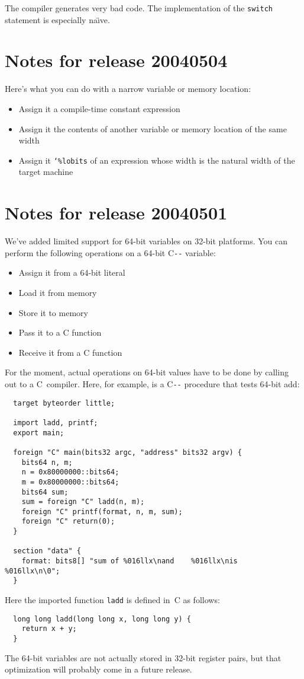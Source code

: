 \documentclass{article}
\def\PAL{\mbox{C{\texttt{-{}-}}}}
\begin{document}
The compiler generates very bad code.
The implementation of the \texttt{switch} statement is especially
na\"\i ve.


\section{Notes for release 20040504}

Here's what you can do with a narrow variable or memory location:
\begin{itemize}
\item
Assign it a compile-time constant expression
\item
Assign it the contents of another variable or memory location of the
same width
\item
Assign it \texttt{\char`\%lobits} of an expression whose width is the
natural width of the target machine
\end{itemize}


\section{Notes for release 20040501}

We've added limited support for 64-bit variables on 32-bit platforms.
You can perform the following operations on a 64-bit {\PAL} variable:
\begin{itemize}
\item Assign it from a 64-bit literal
\item   Load it from memory
\item    Store it to memory
\item   Pass it to a C function
\item   Receive it from a C function
\end{itemize}
For the moment, actual operations on 64-bit values have to be done by
calling out to a C~compiler.
Here, for example, is a {\PAL}
procedure that tests 64-bit add:
\begin{verbatim} 
  target byteorder little;
  
  import ladd, printf;
  export main;
  
  foreign "C" main(bits32 argc, "address" bits32 argv) {
    bits64 n, m;
    n = 0x80000000::bits64;
    m = 0x80000000::bits64;
    bits64 sum;
    sum = foreign "C" ladd(n, m);
    foreign "C" printf(format, n, m, sum);
    foreign "C" return(0);
  }

  section "data" {
    format: bits8[] "sum of %016llx\nand    %016llx\nis     %016llx\n\0";
  }
\end{verbatim}
Here the imported function \texttt{ladd} is defined in~C as follows:
\begin{verbatim} 
  long long ladd(long long x, long long y) {
    return x + y;
  }
\end{verbatim}
The 64-bit variables are not actually stored in 32-bit register pairs,
but that optimization will probably come in a future release.
\end{document}
